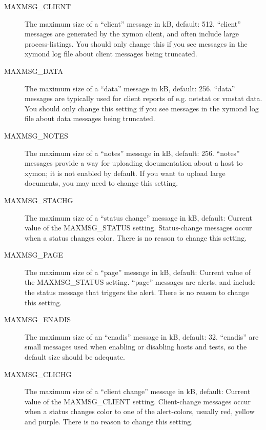 \begin{description}
 

\item[MAXMSG\_CLIENT] The maximum size of a ``client'' message in kB, default: 512. ``client'' messages are generated by the xymon client, and often include large process-listings. You should only change this if you see messages in the xymond log file about client messages being truncated. 

 

\item[MAXMSG\_DATA] The maximum size of a ``data'' message in kB, default: 256. ``data'' messages are typically used for client reports of e.g. netstat or vmstat data. You should only change this setting if you see messages in the xymond log file about data messages being truncated. 

 

\item[MAXMSG\_NOTES] The maximum size of a ``notes'' message in kB, default: 256. ``notes'' messages provide a way for uploading documentation about a host to xymon; it is not enabled by default. If you want to upload large documents, you may need to change this setting. 

 

\item[MAXMSG\_STACHG] The maximum size of a ``status change'' message in kB, default: Current value of the MAXMSG\_STATUS setting. Status-change messages occur when a status changes color. There is no reason to change this setting. 

 

\item[MAXMSG\_PAGE] The maximum size of a ``page'' message in kB, default: Current value of the MAXMSG\_STATUS setting. ``page'' messages are alerts, and include the status message that triggers the alert. There is no reason to change this setting. 

 

\item[MAXMSG\_ENADIS] The maximum size of an ``enadis'' message in kB, default: 32. ``enadis'' are small messages used when enabling or disabling hosts and tests, so the default size should be adequate. 

 

\item[MAXMSG\_CLICHG] The maximum size of a ``client change'' message in kB, default: Current value of the MAXMSG\_CLIENT setting. Client-change messages occur when a status changes color to one of the alert-colors, usually red, yellow and purple. There is no reason to change this setting. 

 


 


\end{description}

